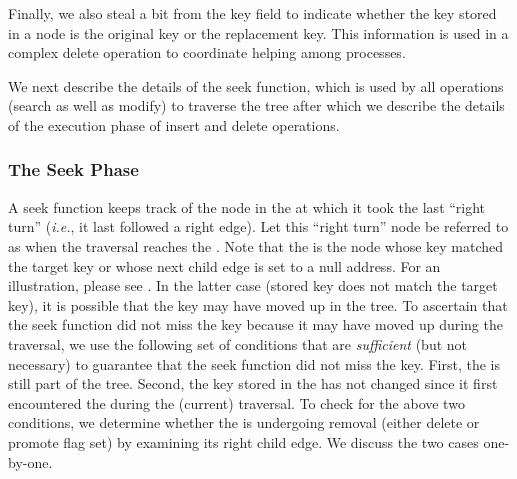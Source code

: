 \begin{limitscope}
Finally, we also steal a bit from the key field to indicate whether the key stored in a node is the original key or the replacement key. This information is used in a complex delete operation to coordinate helping among processes.


We next describe the details of the seek function, which is used by all operations (search as well as modify) to traverse the tree after which we describe the details of 
the execution phase of insert and delete operations.

\subsubsection{The Seek Phase}
A seek function keeps track of the node in the \accesspath{} at which it took the last ``right turn'' (\emph{i.e.}, it last followed a right edge). Let this ``right turn'' node be referred to as \emph{\anchornode} when the traversal reaches the \terminalnode{}. Note that the \terminalnode{} is the node whose key matched the target key or whose next child edge is set to a null address. For an illustration, please see . In the latter case (stored key does not match the target key), it is possible that the key may have moved up in the tree. To ascertain that the seek function did not miss the key because it may have moved up during the traversal, we use the following set of conditions that are \emph{sufficient} (but not necessary) to guarantee that the seek function did not miss the key. First, the \anchornode{} is still part of the tree. Second, the key stored in the \anchornode{} has not changed since it first encountered the \anchornode{} during the (current) traversal. To check for the above two conditions, we determine whether the \anchornode{} is undergoing removal (either delete or promote flag set) by examining its right child edge. We discuss the two cases one-by-one.

\begin{enumerate}[leftmargin=*, label=(\alph*), noitemsep]


\end{enumerate}
\end{limitscope}
